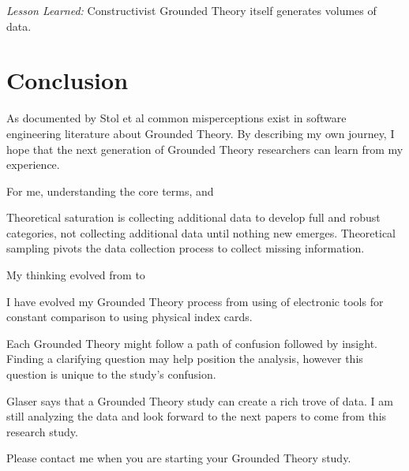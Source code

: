 \textit{Lesson Learned:} Constructivist Grounded Theory itself generates volumes of data.
\section{Conclusion}
\label{Conclusion}
As documented by Stol et al \cite{StolGroundedTheory} common misperceptions exist in software engineering literature about Grounded Theory. By describing my own journey, I hope that the next generation of Grounded Theory researchers can learn from my experience. 

For me, understanding the core terms,  and  

Theoretical saturation is collecting additional data to develop full and robust categories, not collecting additional data until nothing new emerges. Theoretical sampling pivots the data collection process to collect missing information. 

My thinking evolved from  to 

I have evolved my Grounded Theory process from using of electronic tools for constant comparison to using physical index cards.

Each Grounded Theory might follow a path of confusion followed by insight. Finding a clarifying question may help position the analysis, however this question is unique to the study's confusion.

Glaser says that a Grounded Theory study can create a rich trove of data. I am still analyzing the data and look forward to the next papers to come from this research study.

Please contact me when you are starting your Grounded Theory study.























